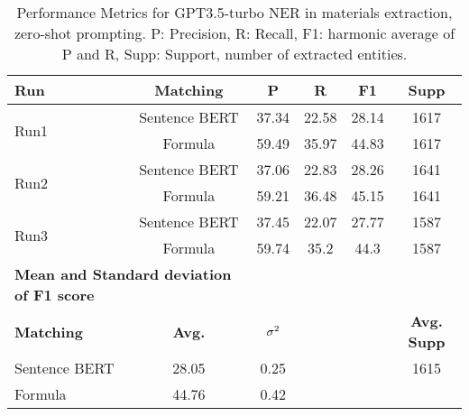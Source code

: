 \begin{table}[htbp]
\small
  \centering
  \caption{Performance Metrics for GPT3.5-turbo NER in materials extraction, zero-shot prompting. P: Precision, R: Recall, F1: harmonic average of P and R, Supp: Support, number of extracted entities.}
  \begin{tabular}{lccccc}
    \toprule
    \textbf{Run} & \textbf{Matching} & \textbf{P} & \textbf{R} & \textbf{F1} & \textbf{Supp} \\
    \midrule
    \multirow{2}{*}{Run1} & Sentence BERT & 37.34 & 22.58 & 28.14 & 1617 \\
    & Formula & 59.49 & 35.97 & 44.83 & 1617 \\
    \midrule
    \multirow{2}{*}{Run2} & Sentence BERT & 37.06 & 22.83 & 28.26 & 1641 \\
    & Formula & 59.21 & 36.48 & 45.15 & 1641 \\
    \midrule
    \multirow{2}{*}{Run3} & Sentence BERT & 37.45 & 22.07 & 27.77 & 1587 \\
    & Formula & 59.74 & 35.2 & 44.3 & 1587 \\
    \midrule
    \multicolumn{2}{l}{\textbf{Mean and Standard deviation of F1 score}} & & & & \\
    \midrule
    \textbf{Matching} & \textbf{Avg.} & $\sigma\textsuperscript{2}$ & & & \textbf{Avg. Supp}\\
    Sentence BERT & 28.05 & 0.25 & & & 1615 \\
    Formula & 44.76 & 0.42 & & & \\
    \bottomrule
  \end{tabular}
\end{table}



